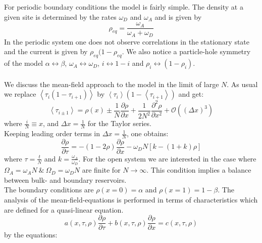 For periodic boundary conditions the model is fairly simple. The density at a given site is determined by the rates $\omega_D$ and $\omega_A$ and is given by
\begin{equation*}
	\rho_{eq}=\frac{\omega_A}{\omega_A+\omega_D}
\end{equation*}
In the periodic system one does not observe correlations in the stationary state and the current is given by $\rho_{eq}(1-\rho_{eq}$. We also notice a particle-hole symmetry of the model $\alpha\leftrightarrow\beta$, $\omega_A\leftrightarrow\omega_D$, $i\leftrightarrow 1-i$ and $\rho_i\leftrightarrow (1-\rho_i)$.\vspace{2mm}\\
\textbf{\underline{}}\vspace{3mm}\\
We discuss the mean-field approach to the model in the limit of large $N$. As usual we replace $\left\langle\tau_i(1-\tau_{i+1})\right\rangle$ by $\left\langle\tau_i\right\rangle\left(1-\left\langle\tau_{i+1}\right\rangle\right)$ and get:
\begin{equation*}
	\left\langle\tau_{i\pm 1}\right\rangle =\rho(x)\pm\frac{1}{N}\frac{\partial\rho}{\partial x}+\frac{1}{2N^2}\frac{\partial^2\rho}{\partial x^2}+\mathcal{O}\left(\left(\Delta x\right)^3\right)
\end{equation*}
where $\frac{i}{N}\equiv x$, and $\Delta x=\frac{1}{N}$ for the Taylor series.\\
Keeping leading order terms in $\Delta x=\frac{1}{N}$, one obtains:
\begin{equation*}
	\frac{\partial \rho}{\partial \tau}=-\left(1-2\rho\right)\frac{\partial\rho}{\partial x}-\omega_D N\left[k-\left(1+k\right)\rho\right]
\end{equation*}
where $\tau=\frac{t}{N}$ and $k=\frac{\omega_A}{\omega_D}$. For the open system we are interested in the case where $\Omega_A=\omega_AN\ \& \ \Omega_D=\omega_DN$ are finite for $N\to\infty$. This condition implies a balance between bulk- and boundary reservoirs.\\
The boundary conditions are $\rho(x=0)=\alpha$ and $\rho(x=1)=1-\beta$. The analysis of the mean-field-equations is performed in terms of characteristics which are defined for a quasi-linear equation.
\begin{equation*}
	a(x,\tau,\rho)\frac{\partial\rho}{\partial\tau} + b(x,\tau,\rho)\frac{\partial\rho}{\partial x}=c(x,\tau,\rho)
\end{equation*}
by the equations:
